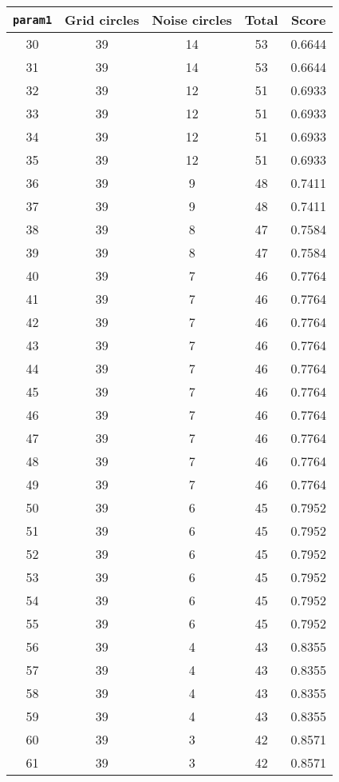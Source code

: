 \documentclass[letterpaper, 12pt]{article}
\begin{document}
\begin{longtable}{|c|c|c|c|c|}
\hline
\textbf{\texttt{param1}} & \textbf{Grid circles} & \textbf{Noise circles} & \textbf{Total} & \textbf{Score} \\
\hline
30 & 39 & 14 & 53 & 0.6644 \\
\hline
31 & 39 & 14 & 53 & 0.6644 \\
\hline
32 & 39 & 12 & 51 & 0.6933 \\
\hline
33 & 39 & 12 & 51 & 0.6933 \\
\hline
34 & 39 & 12 & 51 & 0.6933 \\
\hline
35 & 39 & 12 & 51 & 0.6933 \\
\hline
36 & 39 & 9 & 48 & 0.7411 \\
\hline
37 & 39 & 9 & 48 & 0.7411 \\
\hline
38 & 39 & 8 & 47 & 0.7584 \\
\hline
39 & 39 & 8 & 47 & 0.7584 \\
\hline
40 & 39 & 7 & 46 & 0.7764 \\
\hline
41 & 39 & 7 & 46 & 0.7764 \\
\hline
42 & 39 & 7 & 46 & 0.7764 \\
\hline
43 & 39 & 7 & 46 & 0.7764 \\
\hline
44 & 39 & 7 & 46 & 0.7764 \\
\hline
45 & 39 & 7 & 46 & 0.7764 \\
\hline
46 & 39 & 7 & 46 & 0.7764 \\
\hline
47 & 39 & 7 & 46 & 0.7764 \\
\hline
48 & 39 & 7 & 46 & 0.7764 \\
\hline
49 & 39 & 7 & 46 & 0.7764 \\
\hline
50 & 39 & 6 & 45 & 0.7952 \\
\hline
51 & 39 & 6 & 45 & 0.7952 \\
\hline
52 & 39 & 6 & 45 & 0.7952 \\
\hline
53 & 39 & 6 & 45 & 0.7952 \\
\hline
54 & 39 & 6 & 45 & 0.7952 \\
\hline
55 & 39 & 6 & 45 & 0.7952 \\
\hline
56 & 39 & 4 & 43 & 0.8355 \\
\hline
57 & 39 & 4 & 43 & 0.8355 \\
\hline
58 & 39 & 4 & 43 & 0.8355 \\
\hline
59 & 39 & 4 & 43 & 0.8355 \\
\hline
60 & 39 & 3 & 42 & 0.8571 \\
\hline
61 & 39 & 3 & 42 & 0.8571 \\

\end{longtable}
\end{document}
